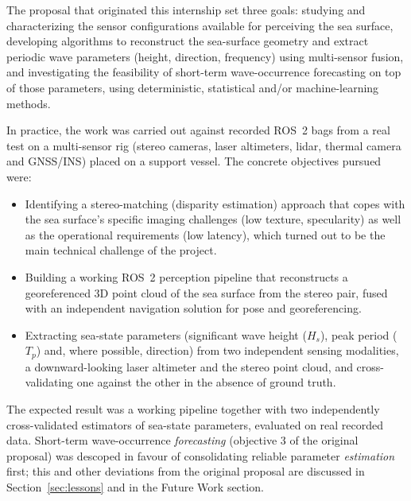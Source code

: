 \label{sec:objectives}

The proposal that originated this internship set three goals: studying and characterizing the sensor configurations available for perceiving the sea surface, developing algorithms to reconstruct the sea-surface geometry and extract periodic wave parameters (height, direction, frequency) using multi-sensor fusion, and investigating the feasibility of short-term wave-occurrence forecasting on top of those parameters, using deterministic, statistical and/or machine-learning methods.

In practice, the work was carried out against recorded ROS~2 bags from a real test on a multi-sensor rig (stereo cameras, laser altimeters, lidar, thermal camera and GNSS/INS) placed on a support vessel. The concrete objectives pursued were:

\begin{itemize}
	\item Identifying a stereo-matching (disparity estimation) approach that copes with the sea surface's specific imaging challenges (low texture, specularity) as well as the operational requirements (low latency), which turned out to be the main technical challenge of the project.
	\item Building a working ROS~2 perception pipeline that reconstructs a georeferenced 3D point cloud of the sea surface from the stereo pair, fused with an independent navigation solution for pose and georeferencing.
	\item Extracting sea-state parameters (significant wave height ($H_s$), peak period ($T_p$) and, where possible, direction) from two independent sensing modalities, a downward-looking laser altimeter and the stereo point cloud, and cross-validating one against the other in the absence of ground truth.
\end{itemize}

The expected result was a working pipeline together with two independently cross-validated estimators of sea-state parameters, evaluated on real recorded data. Short-term wave-occurrence \emph{forecasting} (objective 3 of the original proposal) was descoped in favour of consolidating reliable parameter \emph{estimation} first; this and other deviations from the original proposal are discussed in Section~\ref{sec:lessons} and in the Future Work section.
